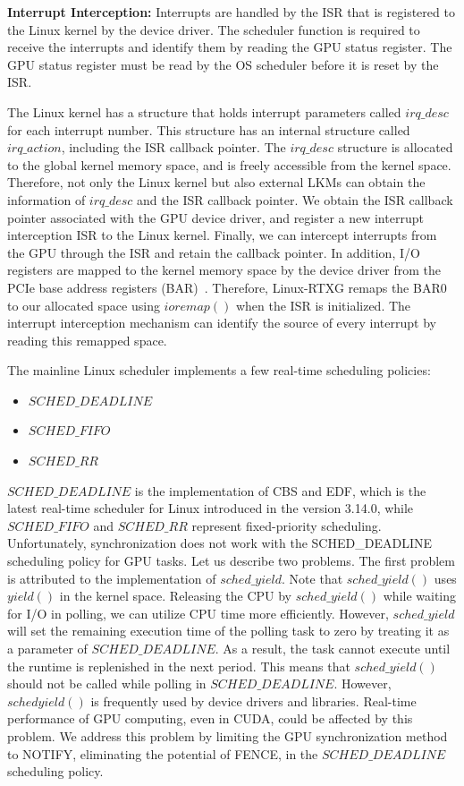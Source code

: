 \textbf{Interrupt Interception:}
Interrupts are handled by the ISR that is registered to the Linux kernel
by the device driver.
The scheduler function is required to receive the interrupts and
identify them by reading the GPU status register.
The GPU status register must be read by the OS scheduler before it is
reset by the ISR.

The Linux kernel has a structure that holds interrupt parameters called
$irq\_desc$ for each interrupt number.
This structure has an internal structure called $irq\_action$,
including the ISR callback pointer.
The $irq\_desc$ structure is allocated to the global kernel memory
space, and is freely accessible from the kernel space.
Therefore, not only the Linux kernel but also external LKMs can obtain
the information of $irq\_desc$ and the ISR callback pointer.
We obtain the ISR callback pointer associated with the GPU device
driver, and register a new interrupt interception ISR to the Linux
kernel.
Finally, we can intercept interrupts from the GPU through the ISR and
retain the callback pointer.
In addition, I/O registers are mapped to the kernel memory space by the
device driver from the PCIe base address registers
(BAR)~\cite{fujii:icpads2013,kato2013zero}.
Therefore, Linux-RTXG remaps the BAR0 to our allocated space using
$ioremap()$ when the ISR is initialized. 
The interrupt interception mechanism can identify the source of every
interrupt by reading this remapped space.

The mainline Linux scheduler implements a few real-time scheduling
policies:
\begin{itemize}
 \item $SCHED\_DEADLINE$
 \item $SCHED\_FIFO$
 \item $SCHED\_RR$
\end{itemize}

$SCHED\_DEADLINE$ is the implementation of CBS and EDF, which is the
latest real-time scheduler for Linux introduced in the version 3.14.0,
while $SCHED\_FIFO$ and $SCHED\_RR$ represent fixed-priority
scheduling.
Unfortunately, synchronization does not work with the SCHED\_DEADLINE
scheduling policy for GPU tasks.
Let us describe two problems.
The first problem is attributed to the implementation of
$sched\_yield$.
Note that $sched\_yield()$ uses $yield()$ in the kernel space.
Releasing the CPU by $sched\_yield()$ while waiting for I/O in polling,
we can utilize CPU time more efficiently.
However, $sched\_yield$ will set the remaining execution time of the
polling task to zero by treating it as a parameter of $SCHED\_DEADLINE$.
As a result, the task cannot execute until the runtime is replenished in
the next period.
This means that $sched\_yield()$ should not be called while polling in
$SCHED\_DEADLINE$.
However, $sched yield()$ is frequently used by device drivers and
libraries.
Real-time performance of GPU computing, even in CUDA, could be affected
by this problem.
We address this problem by limiting the GPU synchronization method to
NOTIFY, eliminating the potential of FENCE, in the $SCHED\_DEADLINE$
scheduling policy.

